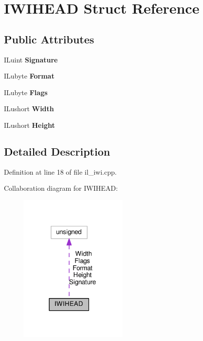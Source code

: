 \hypertarget{structIWIHEAD}{}\section{I\+W\+I\+H\+E\+AD Struct Reference}
\label{structIWIHEAD}
\subsection*{Public Attributes}
\begin{DoxyCompactItemize}
\item 
\mbox{\label{structIWIHEAD_ad85918cb7d1bed59a413c0a0d89e17da}} 
I\+Luint {\bfseries Signature}
\item 
\mbox{\label{structIWIHEAD_a8fe185e3f333574e3f820199918bd2a9}} 
I\+Lubyte {\bfseries Format}
\item 
\mbox{\label{structIWIHEAD_ae9b86bb8e218edea0d9aae44a6ceab6b}} 
I\+Lubyte {\bfseries Flags}
\item 
\mbox{\label{structIWIHEAD_a004e447c9d90565453841108a61e3732}} 
I\+Lushort {\bfseries Width}
\item 
\mbox{\label{structIWIHEAD_a6e72cf5f63a84690bea8d83c01a6244c}} 
I\+Lushort {\bfseries Height}
\end{DoxyCompactItemize}


\subsection{Detailed Description}


Definition at line 18 of file il\+\_\+iwi.\+cpp.



Collaboration diagram for I\+W\+I\+H\+E\+AD\+:
\nopagebreak
\begin{figure}[H]
\begin{center}
\leavevmode
\includegraphics[width=153pt]{d7/d67/structIWIHEAD__coll__graph}
\end{center}
\end{figure}


